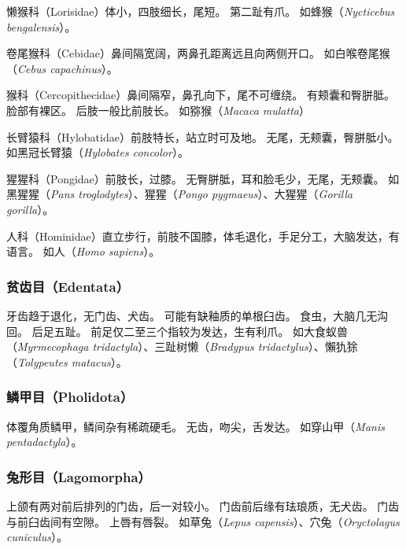 \documentclass[11pt]{article}
\begin{document}
\newline

懒猴科（Lorisidae）体小，四肢细长，尾短。
第二趾有爪。
如蜂猴（\textit{Nycticebus bengalensis}）。

\newline

卷尾猴科（Cebidae）鼻间隔宽阔，两鼻孔距离远且向两侧开口。
如白喉卷尾猴（\textit{Cebus capachinus}）。

\newline

猴科（Cercopithecidae）鼻间隔窄，鼻孔向下，尾不可缠绕。
有颊囊和臀胼胝。
脸部有裸区。
后肢一般比前肢长。
如猕猴（\textit{Macaca mulatta}）

\newline

长臂猿科（Hylobatidae）前肢特长，站立时可及地。
无尾，无颊囊，臀胼胝小。
如黑冠长臂猿（\textit{Hylobates concolor}）。

\newline

猩猩科（Pongidae）前肢长，过膝。
无臀胼胝，耳和脸毛少，无尾，无颊囊。
如黑猩猩（\textit{Pans troglodytes}）、猩猩（\textit{Pongo pygmaeus}）、大猩猩（\textit{Gorilla gorilla}）。

\newline

人科（Hominidae）直立步行，前肢不国膝，体毛退化，手足分工，大脑发达，有语言。
如人（\textit{Homo sapiens}）。

\subsubsection{贫齿目（Edentata）}
牙齿趋于退化，无门齿、犬齿。
可能有缺釉质的单根臼齿。
食虫，大脑几无沟回。
后足五趾。
前足仅二至三个指较为发达，生有利爪。
如大食蚁兽（\textit{Myrmecophaga tridactyla}）、三趾树懒（\textit{Bradypus tridactylus}）、懶犰狳（\textit{Tolypeutes matacus}）。

\subsubsection{鳞甲目（Pholidota）}
体覆角质鳞甲，鳞间杂有稀疏硬毛。
无齿，吻尖，舌发达。
如穿山甲（\textit{Manis pentadactyla}）。

\subsubsection{兔形目（Lagomorpha）}
上颌有两对前后排列的门齿，后一对较小。
门齿前后缘有珐琅质，无犬齿。
门齿与前臼齿间有空隙。
上唇有唇裂。
如草兔（\textit{Lepus capensis}）、穴兔（\textit{Oryctolagus cuniculus}）。
\end{document}
